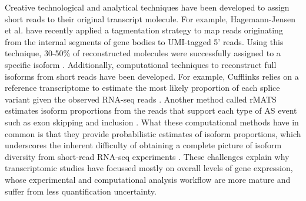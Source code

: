 Creative technological and analytical techniques have been developed to assign short reads to their original transcript molecule. For example, Hagemann-Jensen et al. have recently applied a tagmentation strategy to map reads originating from the internal segments of gene bodies to UMI-tagged 5' reads. Using this technique, 30-50\% of reconstructed molecules were successfully assigned to a specific isoform \cite{Hagemann-Jensen2020-ob}. Additionally, computational techniques to reconstruct full isoforms from short reads have been developed. For example, Cufflinks relies on a reference transcriptome to estimate the most likely proportion of each splice variant given the observed RNA-seq reads \cite{Trapnell2012-zh}. Another method called rMATS estimates isoform proportions from the reads that support each type of AS event such as exon skipping and inclusion \cite{Shen2014-bq}. What these computational methods have in common is that they provide probabilistic estimates of isoform proportions, which underscores the inherent difficulty of obtaining a complete picture of isoform diversity from short-read RNA-seq experiments \cite{Shen2014-bq,Katz2010-kl}. These challenges explain why transcriptomic studies have focussed mostly on overall levels of gene expression, whose experimental and computational analysis workflow are more mature and suffer from less quantification uncertainty.

